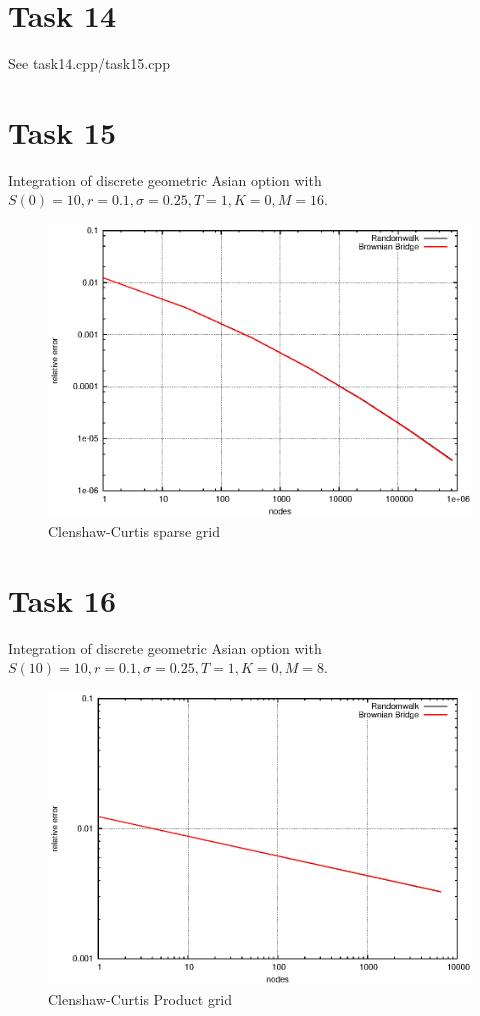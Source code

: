 \documentclass[]{article}
\begin{document}
\section*{Task 14}
See task14.cpp/task15.cpp

\section*{Task 15}
Integration of discrete geometric Asian option with $S(0)=10,r=0.1,\sigma=0.25,T=1,K=0,M=16$.
\begin{figure}[!ht]
\centering
\includegraphics{task15}
\caption{Clenshaw-Curtis sparse grid}
\label{fig:Task15}
\end{figure}
\clearpage

\section*{Task 16}
Integration of discrete geometric Asian option with $S(10)=10,r=0.1,\sigma=0.25,T=1,K=0,M=8$.

\begin{figure}[!ht]
\centering
\includegraphics{task16_ccprod}
\caption{Clenshaw-Curtis Product grid}
\label{fig:Task16a}
\end{figure}
\end{document}
